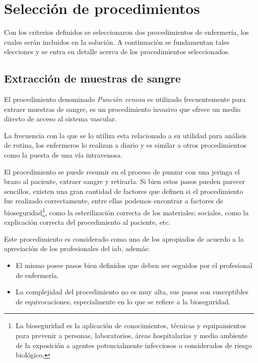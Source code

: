 \section{Selección de procedimientos}
\label{sec:seleccion_escenas}

Con los criterios definidos se seleccionaron dos procedimientos de enfermería,
los cuales serán incluidos en la solución. A continuación se fundamentan tales
elecciones y se entra en detalle acerca de los procedimientos seleccionados.


\subsection{Extracción de muestras de sangre}
\label{sec:hemocultivo}

El procedimiento denominado \emph{Punción venosa} es utilizado frecuentemente
para extraer muestras de sangre, es un procedimiento invasivo que ofrece un
medio directo de acceso al sistema vascular. 

La frecuencia con la que se lo utiliza esta relacionado a su utilidad para
análisis de rutina, los enfermeros lo realizan a diario y es similar a otros
procedimientos como la puesta de una vía intravenosa.

El procedimiento se puede resumir en el proceso de punzar con una jeringa el
brazo al paciente, extraer sangre y retirarla. Si bien estos pasos pueden parecer
sencillos, existen una gran cantidad de factores que definen si el procedimiento
fue realizado correctamente, entre ellas podemos encontrar a factores de 
bioseguridad\footnote{La bioseguridad es la aplicación de conocimientos, técnicas y equipamientos para prevenir a personas, laboratorios, áreas hospitalarias y medio ambiente de la exposición a agentes potencialmente infecciosos o considerados de riesgo biológico.}, como la esterilización correcta de los materiales; sociales, como la explicación correcta del procedimiento al paciente, etc.

Este procedimiento es considerado como uno de los apropiados de acuerdo a
la apreciación de los profesionales del \Gls{iab}, además: 

\begin{itemize}
\item El mismo posee pasos bien definidos que deben ser seguidos por el
    profesional de enfermería.
\item La complejidad del procedimiento no es muy alta, sus pasos son
    susceptibles de equivocaciones, especialmente en lo que se refiere a la
    bioseguridad. 
\end{itemize}



